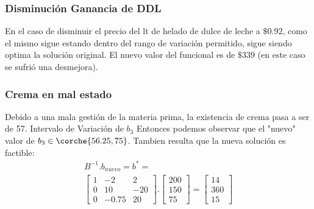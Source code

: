 \begin{homeworkProblem}[-1][Heladería]
\subsubsection{Disminución Ganancia de DDL}
En el caso de disminuir el precio del lt de helado de dulce de leche a $\$0.92$, como el mismo sigue estando dentro del rango de variación permitido, sigue siendo optima la solución original. El nuevo valor del funcional es de $\$339$ (en este caso se sufrió una desmejora).


\subsubsection{Crema en mal estado}
Debido a una mala gestión de la materia prima, la existencia de crema pasa a ser de 57.
Intervalo de Variación de $b_3$
Entonces podemos observar que el "nuevo" valor de $b_3 \in \corche{56.25,75}$. Tambien resulta que la nueva solución es factible:
\begin{align*}
    B^{-1}.b_{nuevo}=b^{*}=
    \\
    \begin{bmatrix}
   1 & -2 & 2 \\
   0 & 10 & -20 \\
   0 & -0.75 & 20
  \end{bmatrix}.
  \begin{bmatrix}
      200 \\
      150 \\
      75
  \end{bmatrix} = 
  \begin{bmatrix}
      14 \\
      360 \\
      15
  \end{bmatrix}
\end{align*}


\end{homeworkProblem}
